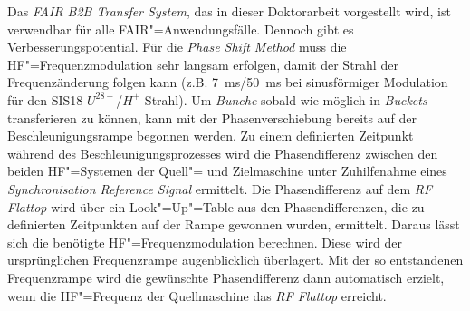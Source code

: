 Das \textit{FAIR B2B Transfer System}, das in dieser Doktorarbeit vorgestellt wird, ist verwendbar f\"ur alle FAIR"=Anwendungsf\"alle. Dennoch gibt es Verbesserungspotential. F\"ur die \textit{Phase Shift Method} muss die HF"=Frequenzmodulation sehr langsam erfolgen, damit der Strahl der Frequenz\"anderung folgen kann (z.B. \SI{7}{\ms}/\SI{50}{\ms} bei sinusf\"ormiger Modulation für den SIS18 $U^\mathit{28+}$/$H^\mathit{+}$ Strahl). Um \textit{Bunche} sobald wie m\"oglich in \textit{Buckets} transferieren zu k\"onnen, kann mit der Phasenverschiebung bereits auf der Beschleunigungsrampe begonnen werden. Zu einem definierten Zeitpunkt w\"ahrend des Beschleunigungsprozesses wird die Phasendifferenz zwischen den beiden HF"=Systemen der Quell"= und Zielmaschine unter Zuhilfenahme eines \textit{Synchronisation Reference Signal} ermittelt. Die Phasendifferenz auf dem \textit{RF Flattop} wird \"uber ein Look"=Up"=Table aus den Phasendifferenzen, die zu definierten Zeitpunkten auf der Rampe gewonnen wurden, ermittelt. Daraus l\"asst sich die ben\"otigte HF"=Frequenzmodulation berechnen. Diese wird der urspr\"unglichen Frequenzrampe augenblicklich \"uberlagert. Mit der so entstandenen Frequenzrampe wird die gew\"unschte Phasendifferenz dann automatisch erzielt, wenn die HF"=Frequenz der Quellmaschine das \textit{RF Flattop} erreicht.